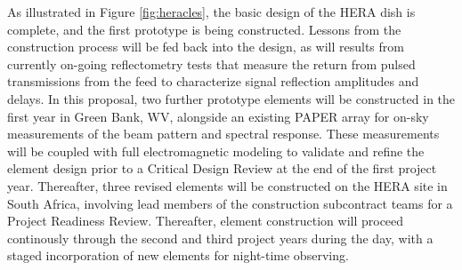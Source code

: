 \documentclass[preprint]{aastex}
\begin{document}
As illustrated in Figure \ref{fig:heracles}, the basic design of the HERA dish
is complete, and the first prototype is being constructed.  Lessons from the
construction process will be fed back into the design, as will results from currently
on-going reflectometry tests that measure the return from pulsed transmissions from the
feed to characterize signal reflection amplitudes and delays.  In this proposal,
two further prototype elements will be constructed in the first year in Green Bank, WV,
alongside an existing PAPER array for on-sky measurements of the beam pattern and spectral 
response.
These measurements will be coupled with full electromagnetic modeling to validate
and refine the element design prior to a Critical Design Review at the end of the first project
year.  Thereafter, three revised elements will be constructed on the HERA site in South Africa, involving
lead members of the construction subcontract teams for a Project Readiness Review.  Thereafter,
element construction will proceed continously through the second and third project years during the day,
with a staged incorporation of new elements for night-time observing.




\end{document}
